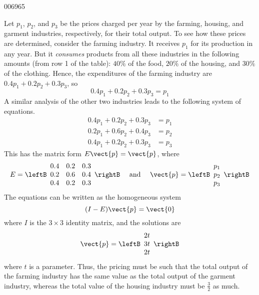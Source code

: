 \begin{example}{}{006965}
\begin{solution}
  Let $p_{1}$, $p_{2}$, and $p_{3}$ be the prices charged per year by the farming, housing, and garment industries, respectively, for their total output. To see how these prices are determined, consider the farming industry. It receives $p_{1}$ for its production in any year. But it \textit{consumes} products from all these industries in the following amounts (from row 1 of the table): $40\%$ of the food, $20\%$ of the housing, and $30\%$ of the clothing. Hence, the expenditures of the farming industry are $0.4p_{1} + 0.2p_{2} + 0.3p_{3}$, so
\begin{equation*}
0.4p_{1} + 0.2p_{2} + 0.3p_{3} = p_{1}
\end{equation*}
A similar analysis of the other two industries leads to the following system of equations.
\begin{align*}
0.4p_{1} + 0.2p_{2} + 0.3p_{3} &= p_{1} \\
0.2p_{1} + 0.6p_{2} + 0.4p_{3} &= p_{2} \\
0.4p_{1} + 0.2p_{2} + 0.3p_{3} &= p_{3}
\end{align*}
This has the matrix form $E\vect{p} = \vect{p}$, where
\begin{equation*}
E = \leftB \begin{array}{rrr}
0.4 & 0.2 & 0.3 \\
0.2 & 0.6 & 0.4 \\
0.4 & 0.2 & 0.3
\end{array} \rightB \quad \mbox{ and } \quad
\vect{p} = \leftB \begin{array}{c}
p_{1} \\
p_{2} \\
p_{3}
\end{array} \rightB
\end{equation*}
The equations can be written as the homogeneous system
\begin{equation*}
(I - E)\vect{p} = \vect{0}
\end{equation*}
where $I$ is the $3 \times 3$ identity matrix, and the solutions are
\begin{equation*}
\vect{p} = \leftB \begin{array}{c}
2t \\
3t \\
2t
\end{array} \rightB
\end{equation*}
where $t$ is a parameter. Thus, the pricing must be such that the total output of the farming industry has the same value as the total output of the garment industry, whereas the total value of the housing industry must be $\frac{3}{2}$ as much.
\end{solution}
\end{example}

